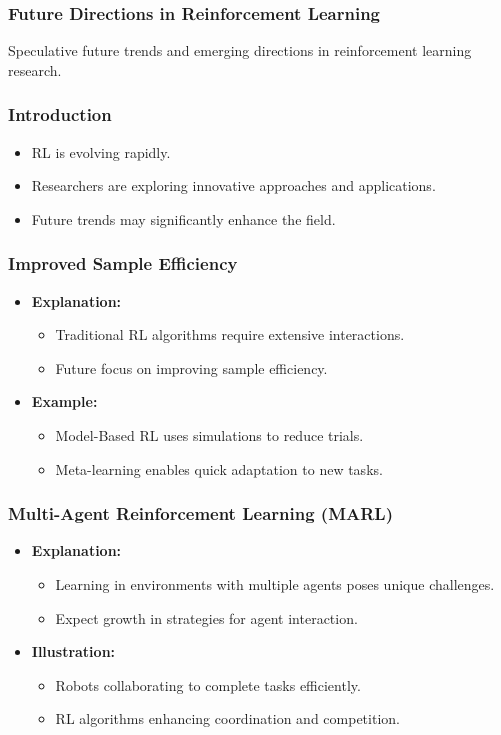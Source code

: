 \documentclass[aspectratio=169]{beamer}
\begin{document}
\begin{frame}[fragile]
    \frametitle{Future Directions in Reinforcement Learning}
    Speculative future trends and emerging directions in reinforcement learning research.
\end{frame}

\begin{frame}[fragile]
    \frametitle{Introduction}
    \begin{itemize}
        \item RL is evolving rapidly.
        \item Researchers are exploring innovative approaches and applications.
        \item Future trends may significantly enhance the field.
    \end{itemize}
\end{frame}

\begin{frame}[fragile]
    \frametitle{Improved Sample Efficiency}
    \begin{itemize}
        \item \textbf{Explanation:} 
        \begin{itemize}
            \item Traditional RL algorithms require extensive interactions.
            \item Future focus on improving sample efficiency.
        \end{itemize}
        \item \textbf{Example:}
        \begin{itemize}
            \item Model-Based RL uses simulations to reduce trials.
            \item Meta-learning enables quick adaptation to new tasks.
        \end{itemize}
    \end{itemize}
\end{frame}

\begin{frame}[fragile]
    \frametitle{Multi-Agent Reinforcement Learning (MARL)}
    \begin{itemize}
        \item \textbf{Explanation:}
        \begin{itemize}
            \item Learning in environments with multiple agents poses unique challenges.
            \item Expect growth in strategies for agent interaction.
        \end{itemize}
        \item \textbf{Illustration:}
        \begin{itemize}
            \item Robots collaborating to complete tasks efficiently.
            \item RL algorithms enhancing coordination and competition.
        \end{itemize}
    \end{itemize}
\end{frame}
\end{document}
